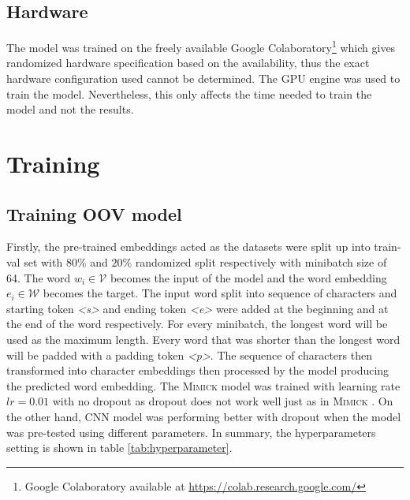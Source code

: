     \subsection{Hardware}
        The model was trained on the freely available Google
        Colaboratory\footnote{Google Colaboratory available at
        \url{https://colab.research.google.com/}} which gives
        randomized hardware specification based on the availability,
        thus the exact hardware configuration used cannot be
        determined. The GPU engine was used to train the model.
        Nevertheless, this only affects the time needed to train the
        model and not the results.

\section{Training}
    \subsection{Training OOV model}
        Firstly, the pre-trained embeddings acted as the datasets were
        split up into train-val set with $80\%$ and $20\%$ randomized
        split respectively with minibatch size of 64. The word $w_i
        \in \mathcal{V}$ becomes the input of the model and the word
        embedding $e_i \in \mathcal{W}$ becomes the target. The input
        word split into sequence of characters and starting token
        \textit{\textless s\textgreater} and ending token
        \textit{\textless e\textgreater} were added at the beginning
        and at the end of the word respectively. For every minibatch,
        the longest word will be used as the maximum length. Every
        word that was shorter than the longest word will be padded
        with a padding token \textit{\textless p\textgreater}.
        The sequence of characters then transformed into character
        embeddings then processed by the model producing the predicted
        word embedding. The \textsc{Mimick} model was trained with
        learning rate $lr = 0.01$ with no dropout as dropout does not
        work well just as in \textsc{Mimick}
        \citep{mimicking2017Pinter}. On the other hand, CNN model was
        performing better with dropout when the model was pre-tested
        using different parameters. In summary, the hyperparameters
        setting is shown in table \ref{tab:hyperparameter}.

